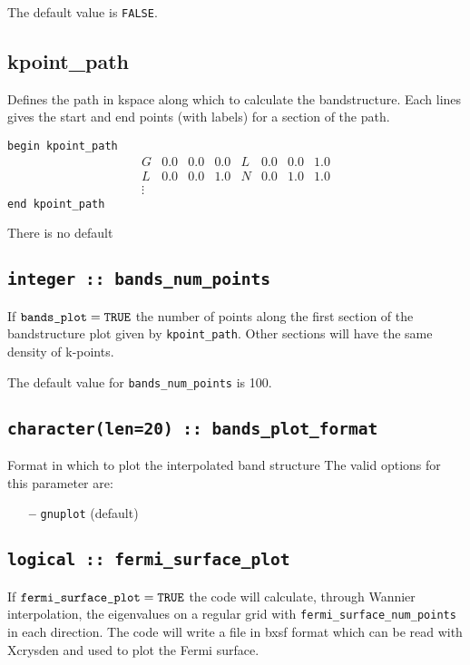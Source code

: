 The default value is \verb#FALSE#.


\subsection[kpoint\_path]{kpoint\_path}
Defines the path in kspace along which to calculate the
bandstructure. Each lines gives the start and end points (with labels)
for a section of the path.

\noindent  \verb#begin kpoint_path#
$$
\begin{array}{cccccccc}
G & 0.0 & 0.0 & 0.0 & L & 0.0 & 0.0 & 1.0 \\
L & 0.0 & 0.0 & 1.0 & N & 0.0 & 1.0 & 1.0 \\
\vdots
\end{array}
$$
\verb#end kpoint_path#


There is no default

\subsection[bands\_num\_points]{\tt integer :: bands\_num\_points}

If $\verb#bands_plot#=\verb#TRUE#$ the number of points along the first
section of the bandstructure plot given by \verb#kpoint_path#. Other
sections will have the same density of k-points.

The default value for \verb#bands_num_points# is 100.


\subsection[bands\_plot\_format]{\tt character(len=20) :: bands\_plot\_format}

Format in which to plot the interpolated band structure
The valid options for this parameter are:
\begin{itemize}
\item[{\bf --}] \verb#gnuplot# (default)
\end{itemize}

\subsection[fermi\_surface\_plot]{\tt logical :: fermi\_surface\_plot}

If $\verb#fermi_surface_plot#=\verb#TRUE#$ the code will calculate,
through Wannier interpolation, the
eigenvalues on a regular grid with \verb#fermi_surface_num_points# in
each direction. The code will write a file in bxsf format which can be
read with Xcrysden and used to plot the Fermi surface.

